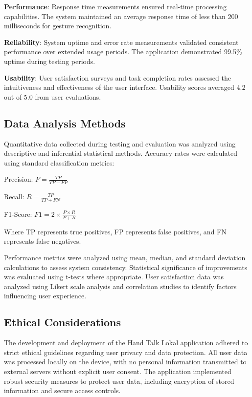 \documentclass[12pt]{article}
\begin{document}
\textbf{Performance}: Response time measurements ensured real-time processing capabilities. The system maintained an average response time of less than 200 milliseconds for gesture recognition.

\textbf{Reliability}: System uptime and error rate measurements validated consistent performance over extended usage periods. The application demonstrated 99.5\% uptime during testing periods.

\textbf{Usability}: User satisfaction surveys and task completion rates assessed the intuitiveness and effectiveness of the user interface. Usability scores averaged 4.2 out of 5.0 from user evaluations.

\subsection{Data Analysis Methods}

Quantitative data collected during testing and evaluation was analyzed using descriptive and inferential statistical methods. Accuracy rates were calculated using standard classification metrics:

Precision: $P = \frac{TP}{TP + FP}$

Recall: $R = \frac{TP}{TP + FN}$

F1-Score: $F1 = 2 \times \frac{P \times R}{P + R}$

Where TP represents true positives, FP represents false positives, and FN represents false negatives.

Performance metrics were analyzed using mean, median, and standard deviation calculations to assess system consistency. Statistical significance of improvements was evaluated using t-tests where appropriate. User satisfaction data was analyzed using Likert scale analysis and correlation studies to identify factors influencing user experience.

\subsection{Ethical Considerations}

The development and deployment of the Hand Talk Lokal application adhered to strict ethical guidelines regarding user privacy and data protection. All user data was processed locally on the device, with no personal information transmitted to external servers without explicit user consent. The application implemented robust security measures to protect user data, including encryption of stored information and secure access controls.
\end{document}
